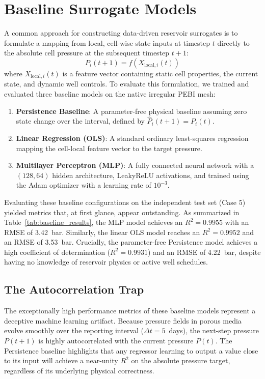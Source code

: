 \documentclass[10pt,twocolumn]{article}
\begin{document}
\section{Baseline Surrogate Models}
A common approach for constructing data-driven reservoir surrogates is to formulate a mapping from local, cell-wise state inputs at timestep $t$ directly to the absolute cell pressure at the subsequent timestep $t+1$:
\begin{equation}
\label{eq:direct_p}
P_i(t+1) = f(X_{\text{local}, i}(t))
\end{equation}
where $X_{\text{local}, i}(t)$ is a feature vector containing static cell properties, the current state, and dynamic well controls. To evaluate this formulation, we trained and evaluated three baseline models on the native irregular PEBI mesh:
\begin{enumerate}
    \item \textbf{Persistence Baseline}: A parameter-free physical baseline assuming zero state change over the interval, defined by $\hat{P}_i(t+1) = P_i(t)$.
    \item \textbf{Linear Regression (OLS)}: A standard ordinary least-squares regression mapping the cell-local feature vector to the target pressure.
    \item \textbf{Multilayer Perceptron (MLP)}: A fully connected neural network with a $(128, 64)$ hidden architecture, LeakyReLU activations, and trained using the Adam optimizer with a learning rate of $10^{-3}$.
\end{enumerate}

Evaluating these baseline configurations on the independent test set (Case 5) yielded metrics that, at first glance, appear outstanding. As summarized in Table~\ref{tab:baseline_results}, the MLP model achieves an $R^2 = 0.9955$ with an RMSE of 3.42~bar. Similarly, the linear OLS model reaches an $R^2 = 0.9952$ and an RMSE of 3.53~bar. Crucially, the parameter-free Persistence model achieves a high coefficient of determination ($R^2 = 0.9931$) and an RMSE of 4.22~bar, despite having no knowledge of reservoir physics or active well schedules.

\subsection{The Autocorrelation Trap}
The exceptionally high performance metrics of these baseline models represent a deceptive machine learning artifact. Because pressure fields in porous media evolve smoothly over the reporting interval ($\Delta t = 5$~days), the next-step pressure $P(t+1)$ is highly autocorrelated with the current pressure $P(t)$. The Persistence baseline highlights that any regressor learning to output a value close to its input will achieve a near-unity $R^2$ on the absolute pressure target, regardless of its underlying physical correctness. 
\end{document}
